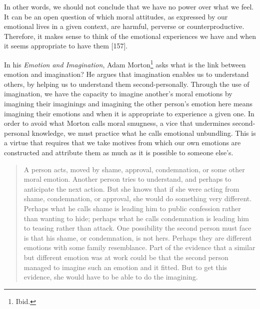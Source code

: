 \documentclass[
  12pt,
]{book}
\theoremstyle{definition}
\theoremstyle{definition}
\theoremstyle{definition}
\theoremstyle{definition}
\theoremstyle{remark}
\begin{document}
In other words, we should not conclude that we have no power over what we feel. It can be an open question of which moral attitudes, as expressed by our emotional lives in a given context, are harmful, perverse or counterproductive. Therefore, it makes sense to think of the emotional experiences we have and when it seems appropriate to have them {[}157{]}.

In his \emph{Emotion and Imagination}, Adam Morton\footnote{Ibid.} asks what is the link between emotion and imagination? He argues that imagination enables us to understand others, by helping us to understand them second-personally. Through the use of imagination, we have the capacity to imagine another's moral emotions by imagining their imaginings and imagining the other person's emotion here means imagining their emotions and when it is appropriate to experience a given one. In order to avoid what Morton calls moral smugness, a vice that undermines second-personal knowledge, we must practice what he calls emotional unbundling. This is a virtue that requires that we take motives from which our own emotions are constructed and attribute them as much as it is possible to someone else's.

\begin{quote}
A person acts, moved by shame, approval, condemnation, or some other moral emotion. Another person tries to understand, and perhaps to anticipate the next action. But she knows that if she were acting from shame, condemnation, or approval, she would do something very different. Perhaps what he calls shame is leading him to public confession rather than wanting to hide; perhaps what he calls condemnation is leading him to teasing rather than attack. One possibility the second person must face is that his shame, or condemnation, is not hers. Perhaps they are different emotions with some family resemblance. Part of the evidence that a similar but different emotion was at work could be that the second person managed to imagine such an emotion and it fitted. But to get this evidence, she would have to be able to do the imagining.
\end{quote}
\end{document}
